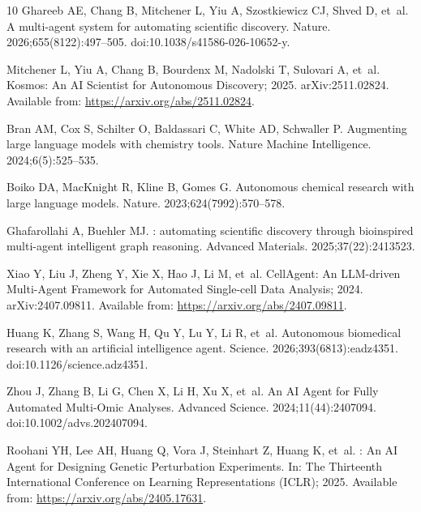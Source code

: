 \documentclass[10pt,letterpaper]{article}
\begin{document}
\begin{thebibliography}{10}
Ghareeb AE, Chang B, Mitchener L, Yiu A, Szostkiewicz CJ, Shved D, et~al.
\newblock A multi-agent system for automating scientific discovery.
\newblock Nature. 2026;655(8122):497--505.
\newblock doi:{10.1038/s41586-026-10652-y}.

Mitchener L, Yiu A, Chang B, Bourdenx M, Nadolski T, Sulovari A, et~al.
  Kosmos: An {AI} Scientist for Autonomous Discovery; 2025.
\newblock arXiv:2511.02824.
\newblock Available from: \url{https://arxiv.org/abs/2511.02824}.

Bran AM, Cox S, Schilter O, Baldassari C, White AD, Schwaller P.
\newblock Augmenting large language models with chemistry tools.
\newblock Nature Machine Intelligence. 2024;6(5):525--535.

Boiko DA, MacKnight R, Kline B, Gomes G.
\newblock Autonomous chemical research with large language models.
\newblock Nature. 2023;624(7992):570--578.

Ghafarollahi A, Buehler MJ.
: automating scientific discovery through bioinspired
  multi-agent intelligent graph reasoning.
\newblock Advanced Materials. 2025;37(22):2413523.

Xiao Y, Liu J, Zheng Y, Xie X, Hao J, Li M, et~al. {CellAgent}: An
  {LLM}-driven Multi-Agent Framework for Automated Single-cell Data Analysis;
  2024.
\newblock arXiv:2407.09811.
\newblock Available from: \url{https://arxiv.org/abs/2407.09811}.

Huang K, Zhang S, Wang H, Qu Y, Lu Y, Li R, et~al.
\newblock Autonomous biomedical research with an artificial intelligence agent.
\newblock Science. 2026;393(6813):eadz4351.
\newblock doi:{10.1126/science.adz4351}.

Zhou J, Zhang B, Li G, Chen X, Li H, Xu X, et~al.
\newblock An {AI} Agent for Fully Automated Multi-Omic Analyses.
\newblock Advanced Science. 2024;11(44):2407094.
\newblock doi:{10.1002/advs.202407094}.

Roohani YH, Lee AH, Huang Q, Vora J, Steinhart Z, Huang K, et~al.
: An {AI} Agent for Designing Genetic Perturbation
  Experiments.
\newblock In: The Thirteenth International Conference on Learning
  Representations (ICLR); 2025. Available from:
  \url{https://arxiv.org/abs/2405.17631}.


\end{thebibliography}
\end{document}

